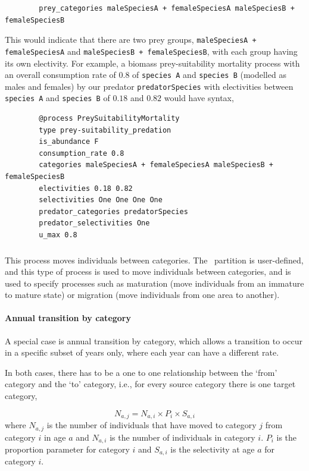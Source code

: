 {\small{\begin{verbatim}
		prey_categories maleSpeciesA + femaleSpeciesA maleSpeciesB + femaleSpeciesB
		\end{verbatim}}}

This would indicate that there are two prey groups, \texttt{maleSpeciesA + femaleSpeciesA} and \texttt{maleSpeciesB + femaleSpeciesB}, with each group having its own electivity. For example, a biomass prey-suitability mortality process with an overall consumption rate of $0.8$ of \texttt{species A} and \texttt{species B} (modelled as males and females) by our predator \texttt{predatorSpecies} with electivities between \texttt{species A} and \texttt{species B} of $0.18$ and $0.82$ would have syntax,

{\small{\begin{verbatim}
		@process PreySuitabilityMortality
		type prey-suitability_predation
		is_abundance F
		consumption_rate 0.8
		categories maleSpeciesA + femaleSpeciesA maleSpeciesB + femaleSpeciesB
		electivities 0.18 0.82
		selectivities One One One One
		predator_categories predatorSpecies
		predator_selectivities One
		u_max 0.8
		\end{verbatim}}}

\subsubsection{}

This process moves individuals between categories. The \CNAME\ partition is user-defined, and this type of process is used to move individuals between categories, and is used to specify processes such as maturation (move individuals from an immature to mature state) or migration (move individuals from one area to another). 

\paragraph{Annual transition by category}

A special case is annual transition by category, which allows a transition to occur in a specific subset of years only, where each year can have a different rate.

In both cases, there has to be a one to one relationship between the `from' category and the `to' category, i.e., for every source category there is one target category, 

\begin{equation}
	N_{a,j} = N_{a,i} \times P_i \times S_{a,i}
\end{equation}
where $N_{a,j}$ is the number of individuals that have moved to category $j$ from category $i$ in age $a$ and $N_{a,i}$ is the number of individuals in category $i$. $P_i$ is the proportion parameter for category $i$ and $S_{a,i}$ is the selectivity at age $a$ for category $i$.

